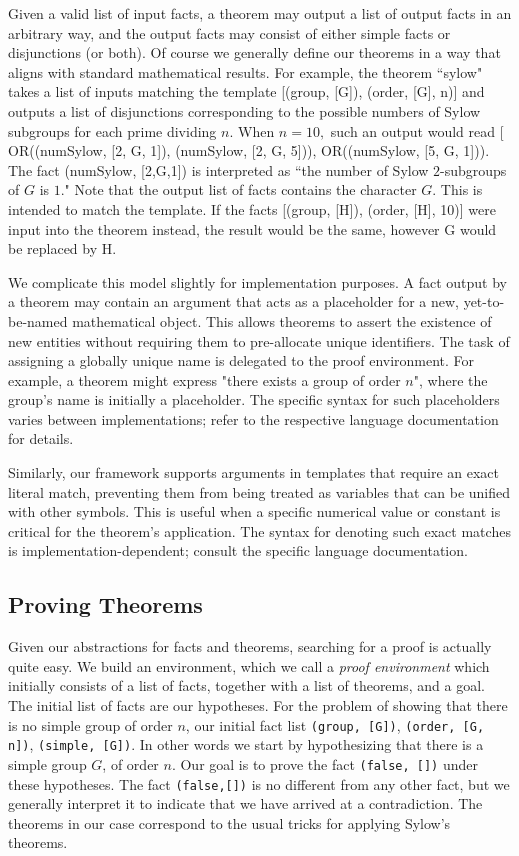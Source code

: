 \documentclass[11pt,
oneside]{article} %
\begin{document}
Given a valid list of input facts, a theorem may output a list of
output facts in an arbitrary way, and the output facts may consist of
either simple facts or disjunctions (or both).  Of course we generally
define our theorems in a way that aligns with standard mathematical
results.  For example, the theorem ``sylow" takes a list of inputs
matching the template [(group, [G]), (order, [G], n)] and outputs a
list of disjunctions corresponding to the possible numbers of Sylow
subgroups for each prime dividing $n$.  When $n=10,$ such an output
would read [ OR((numSylow, [2, G, 1]), (numSylow, [2, G, 5])),
OR((numSylow, [5, G, 1])). The fact (numSylow, [2,G,1]) is interpreted
as ``the number of Sylow $2$-subgroups of $G$ is $1$."  Note that the
output list of facts contains the character $G$.  This is intended to
match the template.  If the facts [(group, [H]), (order, [H], 10)]
were input into the theorem instead, the result would be the same,
however G would be replaced by H.

We complicate this model slightly for implementation purposes. A fact
output by a theorem may contain an argument that acts as a placeholder
for a new, yet-to-be-named mathematical object. This allows theorems
to assert the existence of new entities without requiring them to
pre-allocate unique identifiers. The task of assigning a globally
unique name is delegated to the proof environment. For example, a
theorem might express "there exists a group of order $n$", where the
group's name is initially a placeholder. The specific syntax for such
placeholders varies between implementations; refer to the respective
language documentation for details.

Similarly, our framework supports arguments in templates that require
an exact literal match, preventing them from being treated as
variables that can be unified with other symbols. This is useful when
a specific numerical value or constant is critical for the theorem's
application. The syntax for denoting such exact matches is
implementation-dependent; consult the specific language documentation.

\subsection{Proving Theorems}

Given our abstractions for facts and theorems, searching for a proof
is actually quite easy.  We build an environment, which we call a
\textit{proof environment} which initially consists of a list of
facts, together with a list of theorems, and a goal.  The initial list
of facts are our hypotheses.  For the problem of showing that there is
no simple group of order $n$, our initial fact list \texttt{(group,
  [G])}, \texttt{(order, [G, n])}, \texttt{(simple, [G])}.  In other
words we start by hypothesizing that there is a simple group $G$, of
order $n$.  Our goal is to prove the fact \texttt{(false, [])} under
these hypotheses.  The fact \texttt{(false,[])} is no different from
any other fact, but we generally interpret it to indicate that we have
arrived at a contradiction.  The theorems in our case correspond to
the usual tricks for applying Sylow's theorems.
\end{document}
